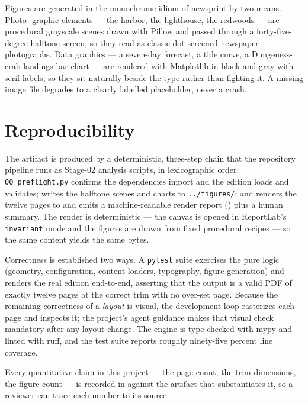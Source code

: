 \documentclass[
  english,
]{article}
\begin{document}
Figures are generated in the monochrome idiom of newsprint by two means.
Photo- graphic elements --- the harbor, the lighthouse, the redwoods ---
are procedural grayscale scenes drawn with Pillow and passed through a
forty-five-degree halftone screen, so they read as classic dot-screened
newspaper photographs. Data graphics --- a seven-day forecast, a tide
curve, a Dungeness-crab landings bar chart --- are rendered with
Matplotlib in black and gray with serif labels, so they sit naturally
beside the type rather than fighting it. A missing image file degrades
to a clearly labelled placeholder, never a crash.

\newpage

\section{Reproducibility}\label{reproducibility}

The artifact is produced by a deterministic, three-step chain that the
repository pipeline runs as Stage-02 analysis scripts, in lexicographic
order: \texttt{00\_preflight.py} confirms the dependencies import and
the edition loads and validates; 
writes the halftone scenes and charts to \texttt{../figures/}; and
 renders the twelve pages to
 and emits a machine-readable
render report () plus a human
summary. The render is deterministic --- the canvas is opened in
ReportLab's \texttt{invariant} mode and the figures are drawn from fixed
procedural recipes --- so the same content yields the same bytes.

Correctness is established two ways. A \texttt{pytest} suite exercises
the pure logic (geometry, configuration, content loaders, typography,
figure generation) and renders the real edition end-to-end, asserting
that the output is a valid PDF of exactly twelve pages at the correct
trim with no over-set page. Because the remaining correctness of a
\emph{layout} is visual, the development loop rasterizes each page and
inspects it; the project's agent guidance makes that visual check
mandatory after any layout change. The engine is type-checked with mypy
and linted with ruff, and the test suite reports roughly ninety-five
percent line coverage.

Every quantitative claim in this project --- the page count, the trim
dimensions, the figure count --- is recorded in
 against the artifact that substantiates
it, so a reviewer can trace each number to its source.
\end{document}
